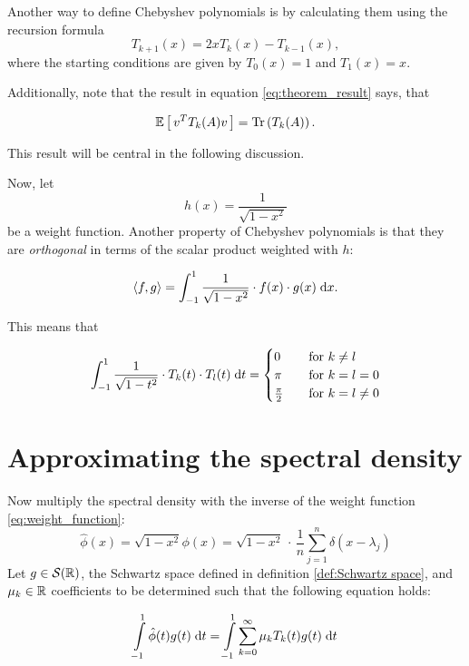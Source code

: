 Another way to define Chebyshev polynomials is by calculating them using the recursion formula
\[
T_{k + 1}(x) = 2xT_k(x) - T_{k - 1}(x),
\]
where the starting conditions are given by $T_0(x) = 1$ and $T_1(x) = x$.

Additionally, note that the result in equation \ref{eq:theorem_result} says, that

\begin{equation} \label{eq:Chebyshev_trace}
    \mathbb{E}\left[\,v^T T_k(A) v\,\right] = \operatorname{Tr}\left(T_k(A)\right).
\end{equation}

This result will be central in the following discussion.


Now, let
\begin{equation} \label{eq:weight_function}
    h(x) = \frac{1}{\sqrt{1 - x^2}}
\end{equation}
be a weight function.
Another property of Chebyshev polynomials is
that they are \emph{orthogonal} in terms of the scalar product weighted with $h$:

\[
\left \langle f, g \right \rangle = \int_{-1}^1 \frac{1}{\sqrt{1 - x^2}} \cdot f(x) \cdot g(x) \;\mathrm{d}x.
\]

This means that

\[
\int_{-1}^1 \frac{1}{\sqrt{1 - t^2}} \cdot T_k(t) \cdot T_l(t) \;\mathrm{d}t =
\begin{cases}
    0               & \quad \text{for } k \neq l\\
    \pi             & \quad \text{for } k = l = 0\\
    \frac{\pi}{2}   & \quad \text{for } k = l \neq 0
\end{cases}
\]

\section{Approximating the spectral density}
Now multiply the spectral density with the inverse of the weight function \ref{eq:weight_function}:
\[
\hat{\phi}(x) = \sqrt{1 - x^2} \phi(x) = \sqrt{1 - x^2} \, \cdot \, \frac{1}{n} \sum_{j = 1}^n \delta(x - \lambda_j)
\]
Let $g \in \mathcal{S}(\mathbb{R})$, the Schwartz space defined in definition \ref{def:Schwartz space},
and $\mu_k \in \mathbb{R}$ coefficients to be determined such that the following equation holds:

\begin{equation} \label{eq:distribution_equality}
    \int \limits_{-1}^1 \hat{\phi}(t) g(t) \;\mathrm{d}t = \int \limits_{-1}^1 \sum_{k = 0}^{\infty} \mu_k T_k(t) g(t) \;\mathrm{d}t
\end{equation}

